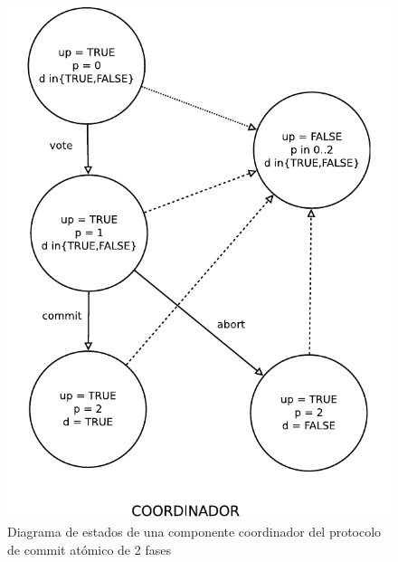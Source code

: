 \documentclass[titlepage, 12pt]{book}
\begin{document}
\begin{figure}[htp]
  \centering
    \includegraphics[scale=0.75]{Imagenes/2pcCoor.pdf}
  \caption{Diagrama de estados de una componente coordinador del protocolo de commit at\'omico de 2 fases}
  \label{2pcc}
\end{figure}
\end{document}
